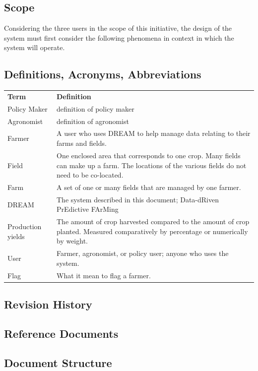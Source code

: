 \subsection{Scope}

\begin{flushleft} %

Considering the three users in the scope of this initiative, the design of the system must first consider the following phenomena in context in which the system will operate.


\end{flushleft}

\subsection{Definitions, Acronyms, Abbreviations}


\begin{center}
\renewcommand{\arraystretch}{1.25}
\begin{tabular}{l >{\raggedright\arraybackslash}p{12cm} } \hline
    \textbf{Term} & \textbf{Definition}\\ 
	Policy Maker & definition of policy maker \\
	Agronomist & definition of agronomist \\
    Farmer & A user who uses DREAM to help manage data relating to their farms and fields.\\
    Field & One enclosed area that corresponds to one crop. Many fields can make up a farm. The locations of the various fields do not need to be co-located.\\
    Farm & A set of one or many fields that are managed by one farmer.\\
    DREAM & The system described in this document; Data-dRiven PrEdictive FArMing\\
    Production yields & The amount of crop harvested compared to the amount of crop planted. Measured comparatively by percentage or numerically by weight.\\
    User & Farmer, agronomist, or policy user; anyone who uses the system.\\
    Flag & What it mean to flag a farmer.\\
    \hline
\end{tabular}
\end{center}



\subsection{Revision History}
\subsection{Reference Documents}
\subsection{Document Structure}